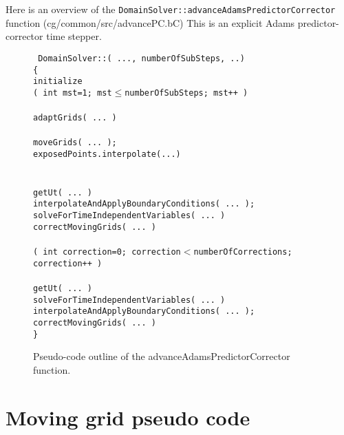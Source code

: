 \documentclass[11pt]{article}
\begin{document}
Here is an overview of the {\tt DomainSolver::advanceAdamsPredictorCorrector} function (cg/common/src/advancePC.bC)
This is an explicit Adams predictor-corrector time stepper.
\begin{figure}[hbt]%
\begin{flushleft}\tt\small
DomainSolver::( ..., numberOfSubSteps, ..) \\
\{  \\
\ia initialize \\
\ia \FOR( int mst=1; mst$\le$numberOfSubSteps; mst++ )  \\
\ib   {} \\
\ic   adaptGrids( ... ) \\
\ib   {} \\
\ic     moveGrids( ... );  \\
\ic     exposedPoints.interpolate(...) \\
\ib \\
\ib   {} \\
\ib   getUt( ... ) \\
\ib   interpolateAndApplyBoundaryConditions( ... ); \\
\ib   solveForTimeIndependentVariables( ... ) \\
\ib   correctMovingGrids( ... ) \\
\ib \\ 
\ib   \FOR( int correction=0; correction$<$numberOfCorrections; correction++ ) \\
\ic     {} \\
\ic     getUt( ... ) \\
\ic     solveForTimeIndependentVariables( ... ) \\
\ic     interpolateAndApplyBoundaryConditions( ... ); \\
\ic     correctMovingGrids( ... ) \\
\}
\end{flushleft}
\caption{Pseudo-code outline of the advanceAdamsPredictorCorrector function.}
\label{alg:advancePC}
\end{figure}

\clearpage 
\section{Moving grid  pseudo code}
\end{document}
